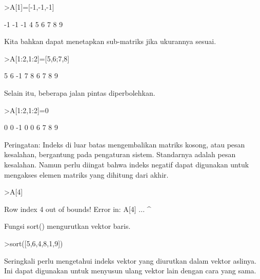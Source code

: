 \documentclass[a4paper,10pt]{article}
\begin{document}
\begin{eulernotebook}
\begin{eulercomment}
\begin{eulercomment}
\begin{eulercomment}
\begin{eulercomment}
\begin{eulercomment}
\begin{eulercomment}
\begin{eulercomment}
\end{eulercomment}
\begin{eulerprompt}
>A[1]=[-1,-1,-1]
\end{eulerprompt}
\begin{euleroutput}
             -1            -1            -1 
              4             5             6 
              7             8             9 
\end{euleroutput}
\begin{eulercomment}
Kita bahkan dapat menetapkan sub-matriks jika ukurannya sesuai.
\end{eulercomment}
\begin{eulerprompt}
>A[1:2,1:2]=[5,6;7,8]
\end{eulerprompt}
\begin{euleroutput}
              5             6            -1 
              7             8             6 
              7             8             9 
\end{euleroutput}
\begin{eulercomment}
Selain itu, beberapa jalan pintas diperbolehkan.
\end{eulercomment}
\begin{eulerprompt}
>A[1:2,1:2]=0
\end{eulerprompt}
\begin{euleroutput}
              0             0            -1 
              0             0             6 
              7             8             9 
\end{euleroutput}
\begin{eulercomment}
Peringatan: Indeks di luar batas mengembalikan matriks kosong, atau
pesan kesalahan, bergantung pada pengaturan sistem. Standarnya adalah
pesan kesalahan. Namun perlu diingat bahwa indeks negatif dapat
digunakan untuk mengakses elemen matriks yang dihitung dari akhir.
\end{eulercomment}
\begin{eulerprompt}
>A[4]
\end{eulerprompt}
\begin{euleroutput}
  Row index 4 out of bounds!
  Error in:
  A[4] ...
      ^
\end{euleroutput}
\begin{eulercomment}
Fungsi sort() mengurutkan vektor baris.
\end{eulercomment}
\begin{eulerprompt}
>sort([5,6,4,8,1,9])
\end{eulerprompt}
\begin{euleroutput}
  [1,  4,  5,  6,  8,  9]
\end{euleroutput}
\begin{eulercomment}
Seringkali perlu mengetahui indeks vektor yang diurutkan dalam vektor
aslinya. Ini dapat digunakan untuk menyusun ulang vektor lain dengan
cara yang sama.


\end{eulercomment}
\end{eulercomment}
\end{eulercomment}
\end{eulercomment}
\end{eulercomment}
\end{eulercomment}
\end{eulercomment}
\end{eulernotebook}
\end{document}
